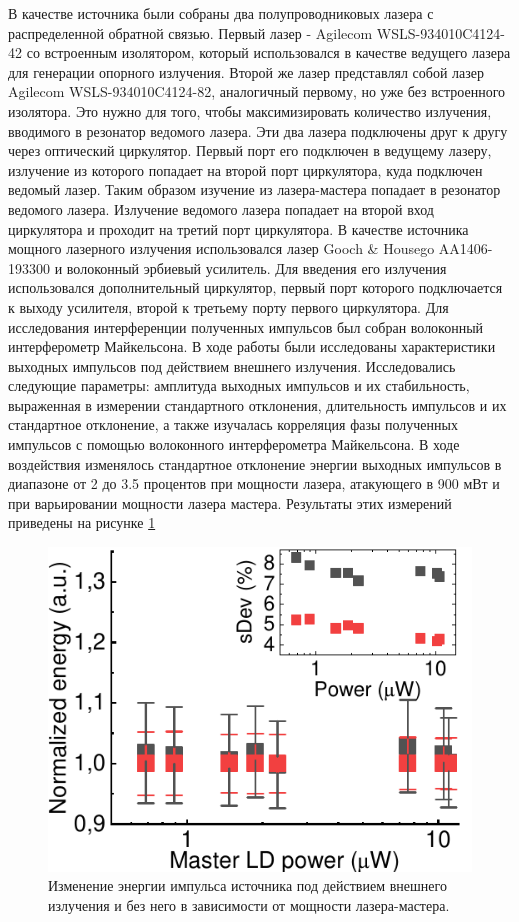 В качестве источника были собраны два полупроводниковых лазера с распределенной обратной связью. Первый лазер - Agilecom WSLS-934010C4124-42 со встроенным изолятором, который использовался в качестве ведущего лазера для генерации опорного излучения. Второй же лазер представлял собой лазер Agilecom WSLS-934010C4124-82, аналогичный первому, но уже без встроенного изолятора. Это нужно для того, чтобы максимизировать количество излучения, вводимого в резонатор ведомого лазера. Эти два лазера подключены друг к другу через оптический циркулятор. Первый порт его подключен в ведущему лазеру, излучение из которого попадает на второй порт циркулятора, куда подключен ведомый лазер. Таким образом изучение из лазера-мастера попадает в резонатор ведомого лазера. Излучение ведомого лазера попадает на второй вход циркулятора и проходит на третий порт циркулятора. В качестве источника мощного лазерного излучения использовался лазер Gooch \& Housego AA1406-193300 и волоконный эрбиевый усилитель. Для введения его излучения использовался дополнительный циркулятор, первый порт которого подключается к выходу усилителя, второй к третьему порту первого циркулятора. Для исследования интерференции полученных импульсов был собран волоконный интерферометр Майкельсона. 
\newline В ходе работы были исследованы характеристики выходных импульсов под действием внешнего излучения. Исследовались следующие параметры: амплитуда выходных импульсов и их стабильность, выраженная в измерении стандартного отклонения, длительность импульсов и их стандартное отклонение, а также изучалась корреляция фазы полученных импульсов с помощью волоконного интерферометра Майкельсона. В ходе воздействия изменялось стандартное отклонение энергии выходных импульсов в диапазоне от 2 до 3.5 процентов при мощности лазера, атакующего в 900 мВт и при варьировании мощности лазера мастера. Результаты этих измерений приведены на рисунке \ref{fig:area MDI ref}
\begin{figure}
    \centering
    \includegraphics{images/area_under_attack.pdf}
    \caption{Изменение энергии импульса источника под действием внешнего излучения и без него в зависимости от мощности лазера-мастера.}
    \label{fig:area MDI ref}
\end{figure}
